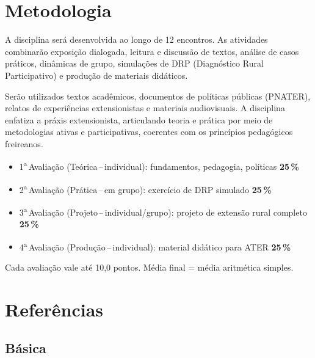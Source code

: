 \documentclass[11pt,a4paper]{article}
\begin{document}
\section*{Metodologia}

A disciplina será desenvolvida ao longo de 12 encontros. As atividades combinarão exposição dialogada, leitura e discussão de textos, análise de casos práticos, dinâmicas de grupo, simulações de DRP (Diagnóstico Rural Participativo) e produção de materiais didáticos.

Serão utilizados textos acadêmicos, documentos de políticas públicas (PNATER), relatos de experiências extensionistas e materiais audiovisuais. A disciplina enfatiza a práxis extensionista, articulando teoria e prática por meio de metodologias ativas e participativas, coerentes com os princípios pedagógicos freireanos.


\begin{tcolorbox}[uefsbox, colframe=uefsaccent, colback=white, title={\bfseries\color{white}\scshape Avaliação}, fonttitle=\normalsize, coltitle=white, colbacktitle=uefsaccent, attach boxed title to top left={yshift=-2mm,xshift=2mm}, boxed title style={arc=2pt,boxrule=0pt}]
\begin{itemize}[leftmargin=1.2em]
\item 1\textsuperscript{a}\,Avaliação (Teórica\,--\,individual): fundamentos, pedagogia, políticas\,\dotfill\,\textbf{25\,\%}
\item 2\textsuperscript{a}\,Avaliação (Prática\,--\,em grupo): exercício de DRP simulado\,\dotfill\,\textbf{25\,\%}
\item 3\textsuperscript{a}\,Avaliação (Projeto\,--\,individual/grupo): projeto de extensão rural completo\,\dotfill\,\textbf{25\,\%}
\item 4\textsuperscript{a}\,Avaliação (Produção\,--\,individual): material didático para ATER\,\dotfill\,\textbf{25\,\%}
\end{itemize}
\vspace{4pt}
{\footnotesize Cada avaliação vale até 10,0 pontos. Média final = média aritmética simples.}
\end{tcolorbox}



\section*{Referências}

\subsection*{Básica}
\end{document}
